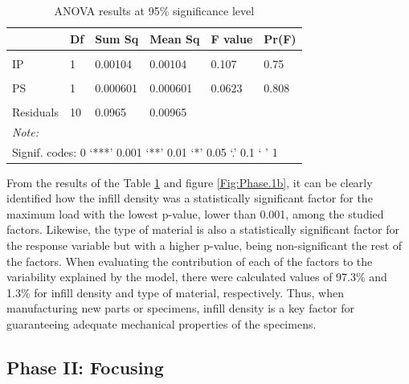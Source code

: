 \documentclass[]{interact}
\theoremstyle{plain}%
\theoremstyle{definition}
\theoremstyle{remark}
\begin{document}
\begin{table}

\caption{\label{tab:Table.Anova.fase1}ANOVA results at 95\% significance level \label{tab:anova.phase1}}
\centering
\begin{tabular}[t]{llllll}
\toprule
  & Df & Sum Sq & Mean Sq & F value & Pr(F)\\
\midrule
\cellcolor{gray!6}{LH} & \cellcolor{gray!6}{1} & \cellcolor{gray!6}{0.0129} & \cellcolor{gray!6}{0.0129} & \cellcolor{gray!6}{1.34} & \cellcolor{gray!6}{0.274}\\
IP & 1 & 0.00104 & 0.00104 & 0.107 & 0.75\\
\cellcolor{gray!6}{ID} & \cellcolor{gray!6}{1} & \cellcolor{gray!6}{7.96} & \cellcolor{gray!6}{7.96} & \cellcolor{gray!6}{825} & \cellcolor{gray!6}{6.1e-11***}\\
PS & 1 & 0.000601 & 0.000601 & 0.0623 & 0.808\\
\cellcolor{gray!6}{Material} & \cellcolor{gray!6}{1} & \cellcolor{gray!6}{0.106} & \cellcolor{gray!6}{0.106} & \cellcolor{gray!6}{11} & \cellcolor{gray!6}{0.00788**}\\
Residuals & 10 & 0.0965 & 0.00965 &  & \\
\bottomrule
\multicolumn{6}{l}{\rule{0pt}{1em}\textit{Note: }}\\
\multicolumn{6}{l}{\rule{0pt}{1em}Signif. codes:  0 ‘***’ 0.001 ‘**’ 0.01 ‘*’ 0.05 ‘.’ 0.1 ‘ ’ 1}\\
\end{tabular}
\end{table}

From the results of the Table \ref{tab:anova.phase1} and figure
\ref{Fig:Phase.1b}, it can be clearly identified how the infill density
was a statistically significant factor for the maximum load with the
lowest p-value, lower than 0.001, among the studied factors. Likewise,
the type of material is also a statistically significant factor for the
response variable but with a higher p-value, being non-significant the
rest of the factors. When evaluating the contribution of each of the
factors to the variability explained by the model, there were calculated
values of 97.3\% and 1.3\% for infill density and type of material,
respectively. Thus, when manufacturing new parts or specimens, infill
density is a key factor for guaranteeing adequate mechanical properties
of the specimens.

\hypertarget{phase-ii-focusing}{%
\subsection{Phase II: Focusing}\label{phase-ii-focusing}}
\end{document}
